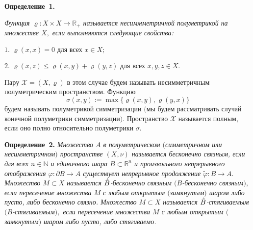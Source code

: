 





\vzmscaption






\textbf{Определение~1.} {\it
Функция $\varrho:X\times X\rightarrow \mathbb{R}_+$ называется несиммметричной полуметрикой на множестве $X,$
если выполняются следующие свойства:

$1.$ $\varrho(x,x)= 0$ для всех $x\in X;$


$2.$ $\varrho(x,z)\leqslant \varrho(x,y)+ \varrho(y,z)$ для всех $x,y,z\in X.$

Пару $\mathcal{X}=(X,\varrho)$ в этом случае будем называть несимметричным полуметрическим пространством.
Функцию $$\sigma(x,y):=\max\{\varrho(x,y), \varrho(y,x)\}$$ будем называть полуметрикой симметри\-за\-ции $($мы будем рассматривать случай конечной полуметрики симметри\-за\-ции$)$. Пространство $\mathcal{X}$ называется полным, если оно полно относительно полуметрики  $\sigma.$
}


\textbf{Определение~2.} {\it   Множество $A$ в   полуметрическом $($сим\-мет\-ричном или несимметричном$)$ пространстве $(X,\nu) $
называется бесконечно связным, если для всех $n\in \mathbb{N}$ и
единичного шара $B\subset \mathbb{R}^n$ и произвольного
непрерывного отображения $\varphi:\partial B\rightarrow A$
существует непрерывное продолжение $\tilde{\varphi}: B\rightarrow
A.$
  Множество $M\subset X $ называется
$\mathaccent'27{B}$-бесконечно связным $({B}$-бесконечно связным$),$ если пересечение множества
$M$ с любым открытым $($замкнутым$)$ шаром либо пусто, либо бесконечно связно.  Множество $M\subset X $ называется
$\mathaccent'27{B}$-стягиваемым $({B}$-стягиваемым$),$ если пересечение множества
$M$ с любым открытым $($замкнутым$)$ шаром либо пусто, либо стягиваемо.
}



